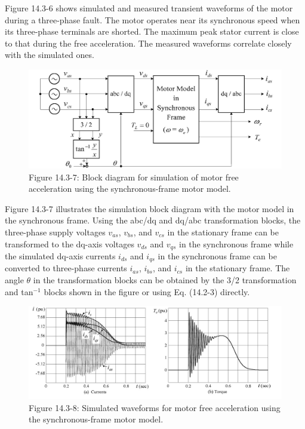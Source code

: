 \documentclass[letterpaper,12pt]{article}
\begin{document}
Figure 14.3-6 shows simulated and measured transient waveforms of the motor during a three-phase fault. The motor operates near its synchronous speed when its three-phase terminals are shorted. The maximum peak stator current is close to that during the free acceleration. The measured waveforms correlate closely with the simulated ones.

\begin{figure}[h]
\centering
\includegraphics{graficos/img09.jpg}
\caption{Figure 14.3-7: Block diagram for simulation of motor free acceleration using the synchronous-frame motor model.}
\end{figure}
\FloatBarrier

Figure 14.3-7 illustrates the simulation block diagram with the motor model in the synchronous frame. Using the abc/dq and dq/abc transformation blocks, the three-phase supply voltages $v_{as}$, $v_{bs}$, and $v_{cs}$ in the stationary frame can be transformed to the dq-axis voltages $v_{ds}$ and $v_{qs}$ in the synchronous frame while the simulated dq-axis currents $i_{ds}$ and $i_{qs}$ in the synchronous frame can be converted to three-phase currents $i_{as}$, $i_{bs}$, and $i_{cs}$ in the stationary frame. The angle $\theta$ in the transformation blocks can be obtained by the 3/2 transformation and tan$^{-1}$ blocks shown in the figure or using Eq. (14.2-3) directly.

\begin{figure}[h]
\centering
\includegraphics{graficos/img10.jpg}
\caption{Figure 14.3-8: Simulated waveforms for motor free acceleration using the synchronous-frame motor model.}
\end{figure}
\FloatBarrier
\end{document}
